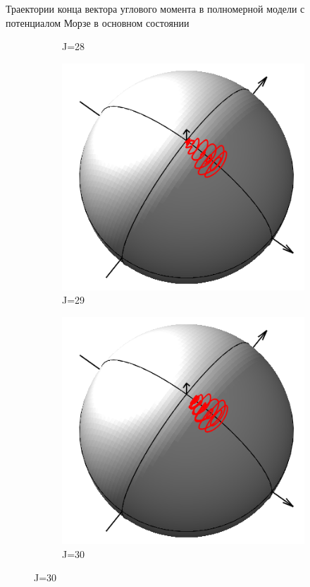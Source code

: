 \documentclass[hyperref={pdfpagelabels=false},usepdftitle=false, xcolor = dvipsnames]{beamer}
\begin{document}
\begin{frame}{\small Траектории конца вектора углового момента в полномерной модели с потенциалом Морзе в основном состоянии}
\begin{block}{}
\begin{figure}
\begin{subfigure}{0.25\textwidth}
	    \caption{J=28}
	  \end{subfigure}
	  \begin{subfigure}{0.25\textwidth}
	    \includegraphics[width = \linewidth]{../pictures/MorseGroundState00/plot_J=29.png}
	    \caption{J=29}
	  \end{subfigure}
	  \begin{subfigure}{0.25\textwidth}
	    \includegraphics[width = \linewidth]{../pictures/MorseGroundState00/plot_J=30.png}
	    \caption{J=30}
	  \end{subfigure}
	 \end{figure}
  \end{block}
\end{frame}
\end{document}
